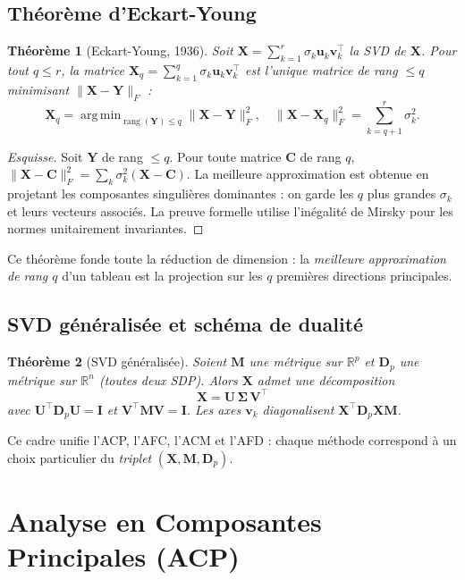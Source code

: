 \documentclass[11pt, a4paper, openany]{book}
\theoremstyle{plain}
\newtheorem{theorem}{Théorème}[chapter]
\theoremstyle{definition}
\theoremstyle{remark}
\newcommand{\R}{\mathbb{R}}
\newcommand{\1}{\mathds{1}}
\DeclareMathOperator{\rang}{rang}
\DeclareMathOperator*{\argmin}{arg\,min}
\newcommand{\X}{\mathbf{X}}
\newcommand{\M}{\mathbf{M}}
\newcommand{\U}{\mathbf{U}}
\newcommand{\bSigma}{\mathbf{\Sigma}}
\begin{document}
\section{Théorème d'Eckart-Young}

\begin{theorem}[Eckart-Young, 1936]
Soit $\X = \sum_{k=1}^r \sigma_k \mathbf{u}_k \mathbf{v}_k^\top$ la SVD de $\X$. Pour tout
$q \leq r$, la matrice $\X_q = \sum_{k=1}^q \sigma_k \mathbf{u}_k \mathbf{v}_k^\top$ est
l'unique matrice de rang $\leq q$ minimisant $\|\X - \mathbf{Y}\|_F$ :
\[
\X_q = \argmin_{\rang(\mathbf{Y}) \leq q} \|\X - \mathbf{Y}\|_F^2,
\quad
\|\X - \X_q\|_F^2 = \sum_{k=q+1}^r \sigma_k^2.
\]
\end{theorem}

\begin{proof}[Esquisse]
Soit $\mathbf{Y}$ de rang $\leq q$. Pour toute matrice $\mathbf{C}$ de rang
$q$, $\|\X - \mathbf{C}\|_F^2 = \sum_k \sigma_k^2(\X - \mathbf{C})$. La meilleure
approximation est obtenue en projetant les composantes singulières dominantes :
on garde les $q$ plus grandes $\sigma_k$ et leurs vecteurs associés. La preuve
formelle utilise l'inégalité de Mirsky pour les normes unitairement invariantes.
\end{proof}

Ce théorème fonde toute la réduction de dimension : la \textit{meilleure
approximation de rang $q$} d'un tableau est la projection sur les $q$
premières directions principales.

\section{SVD généralisée et schéma de dualité}

\begin{theorem}[SVD généralisée]
Soient $\M$ une métrique sur $\R^p$ et $\mathbf{D}_p$ une métrique sur $\R^n$
(toutes deux SDP). Alors $\X$ admet une décomposition
\[
\X = \U\, \bSigma\, \mathbf{V}^\top
\]
avec $\U^\top \mathbf{D}_p \U = \mathbf{I}$ et $\mathbf{V}^\top \M \mathbf{V} = \mathbf{I}$.
Les axes $\mathbf{v}_k$ diagonalisent $\X^\top \mathbf{D}_p \X \M$.
\end{theorem}

Ce cadre unifie l'ACP, l'AFC, l'ACM et l'AFD : chaque méthode correspond
à un choix particulier du \textit{triplet} $(\X, \M, \mathbf{D}_p)$.

\chapter{Analyse en Composantes Principales (ACP)}
\end{document}
